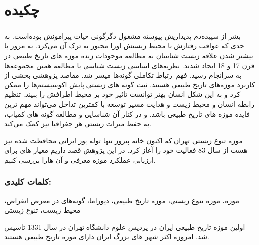 
\chapter*{چکیده}

\paragraph*{}
بشر از سپیده‌دم پدیداریش پیوسته مشغول دگرگونی حیات پیرامونش بوده‌است. به حدی که عواقب رفتارش با محیط زیستش اورا مجبور به ترک آن می‌کرد. به مرور با بیشتر شدن علاقه زیست شناسان به مطالعه موجودات زنده موزه های تاریخ طبیعی در قرن 17 و 18 ایجاد شدند. 
نظریه‌های اساسی زیست شناسی با مطالعه همین مجموعه‌ها به سرانجام رسید. فهم ارتباط تکاملی گونه‌ها میسر شد. مقاصد پزوهشی بخشی از کاربرد موزه‌های تاریخ طبیعی هستند. ثبت گونه های زیستی پایش اکوسیستم‌ها را ممکن کرد و به این شکل انسان بهتر توانست تاثیر خود بر محیط اطرافش  را ببیند. تنظیم رابطه انسان و محیط زیست و هدایت مسیر توسعه با کمترین تداخل می‌تواند مهم ترین فایده موزه های تاریخ طبیعی باشد. و در کنار آن شناسایی و مطالعه گونه های کمیاب، به حفظ میراث زیستی هر جغرافیا نیز کمک می‌کند.

موزه تنوع زیستی تهران که اکنون خانه پیروز تنها توله یوز ایرانی محاقظت شده نیز هست از سال 83 فعالیت خود را آغاز کرد. 
در این پژوهش قصد داریم معیار های برای ارزیابی عملکرد موزه معرفی و آن هارا بررسی کنیم.
\subsection*{کلمات کلیدی:}
موزه، موزه تنوع زیستی، موزه تاریخ طبیعی، دیوراما، گونه‌های در معرض انقراض، محیط زیست، تنوع زیستی


اولین موزه تاریخ طبیعی ایران در پردیس علوم دانشگاه تهران در سال 1331 تاسیس شد. امروزه اکثر شهر های بزرگ ایران دارای موزه تاریخ طبیعی هستند.
